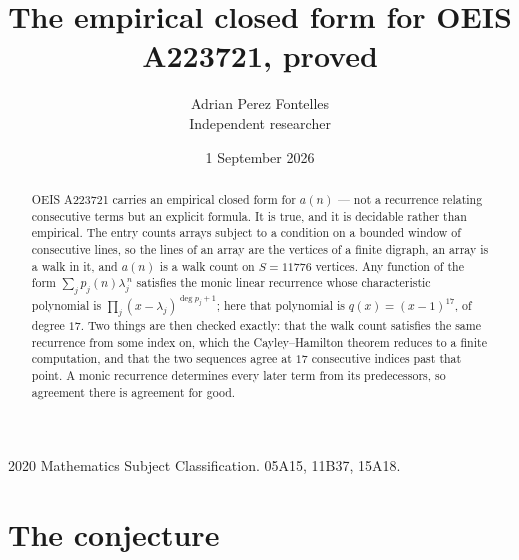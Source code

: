 \documentclass[11pt,a4paper]{article}
\title{The empirical closed form for OEIS A223721, proved}
\author{Adrian Perez Fontelles\\ \small Independent researcher}
\date{1 September 2026}
\theoremstyle{plain}
\theoremstyle{definition}
\begin{document}
\maketitle

\begin{abstract}
OEIS A223721 carries an empirical closed form for $a(n)$ --- not a recurrence relating
consecutive terms but an explicit formula. It is true, and it is decidable rather than
empirical. The entry counts arrays subject to a condition on a bounded window of consecutive lines, so the lines of an array are the
vertices of a finite digraph, an array is a walk in it, and $a(n)$ is a walk count on
$S=11776$ vertices. Any function of the form $\sum_j p_j(n)\lambda_j^{\,n}$ satisfies the
monic linear recurrence whose characteristic polynomial is
$\prod_j(x-\lambda_j)^{\deg p_j+1}$; here that polynomial is $q(x)=(x-1)^{17}$, of degree
$17$. Two things are then checked exactly: that the walk count satisfies the same
recurrence from some index on, which the Cayley--Hamilton theorem reduces to a finite
computation, and that the two sequences agree at $17$ consecutive indices past that
point. A monic recurrence determines every later term from its predecessors, so agreement
there is agreement for good.
\end{abstract}

\noindent\small 2020 Mathematics Subject Classification. 05A15, 11B37, 15A18.\normalsize

\section{The conjecture}
\end{document}
